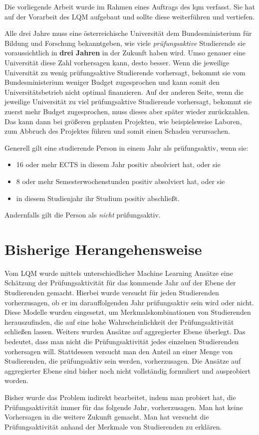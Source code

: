 

Die vorliegende Arbeit wurde im Rahmen eines Auftrags des \gls{lqm} verfasst. Sie hat auf der Vorarbeit des LQM aufgebaut und sollte diese weiterf\"uhren
und vertiefen.

Alle drei Jahre muss eine \"osterreichische Universität dem Bundesministerium f\"ur Bildung und Forschung
bekanntgeben, wie viele \textit{pr\"ufungsaktive} Studierende sie voraussichtlich in \textbf{drei Jahren}
in der Zukunft haben wird. Umso genauer eine Universität diese Zahl vorhersagen kann, desto besser.
Wenn die jeweilige Universität zu wenig pr\"ufungsaktive Studierende vorhersagt, bekommt sie vom Bundesministerium
weniger Budget zugesprochen und kann somit den Universitätsbetrieb nicht optimal finanzieren. Auf der anderen Seite,
wenn die jeweilige Universität zu viel pr\"ufungsaktive Studierende vorhersagt, bekommt sie zuerst mehr Budget zugesprochen,
muss dieses aber sp\"ater wieder zur\"uckzahlen. Das kann dann bei gr\"o{\ss}eren geplanten Projekten, wie beispielsweise Laboren,
zum Abbruch des Projektes f\"uhren und somit einen Schaden verursachen.

\noindent Generell gilt eine studierende Person in einem Jahr als pr\"ufungsaktiv, wenn sie:

\begin{itemize}
    \item 16 oder mehr ECTS in diesem Jahr positiv absolviert hat, oder sie
    \item 8 oder mehr Semesterwochenstunden positiv absolviert hat, oder sie
    \item in diesem Studienjahr ihr Studium positiv abschlie{\ss}t.
\end{itemize}
Andernfalls gilt die Person als \textit{nicht} pr\"ufungsaktiv.


\section{Bisherige Herangehensweise}

Vom LQM wurde mittels unterschiedlicher Machine Learning Ans\"atze eine Sch\"atzung der Pr\"ufungsaktivit\"at
f\"ur das kommende Jahr auf der Ebene der Studierenden gemacht. 
Hierbei wurde versucht f\"ur jeden Studierenden vorherzusagen, ob er im darauffolgenden Jahr pr\"ufungsaktiv sein wird oder nicht.
Diese Modelle wurden eingesetzt, um Merkmalskombinationen von Studierenden herauszufinden,
die auf eine hohe Wahrscheinlichkeit der Pr\"ufungsaktivit\"at schlie{\ss}en lassen.
Weiters wurden Ans\"atze auf aggregierter Ebene \"uberlegt. Das bedeutet, dass man nicht die Pr\"ufungsaktivit\"at jedes
einzelnen Studierenden vorhersagen will. Stattdessen
versucht man den Anteil an einer Menge von Studierenden, die pr\"ufungsaktiv sein werden, vorherzusagen.
Die Ans\"atze auf aggregierter Ebene sind bisher noch nicht vollst\"andig formuliert und ausprobiert worden.


Bisher wurde das Problem indirekt bearbeitet, indem man probiert hat, die Pr\"ufungsaktivit\"at
immer f\"ur das folgende Jahr, vorherzusagen. Man hat keine Vorhersagen in die weitere Zukunft gemacht.
Man hat versucht die Pr\"ufungsaktivit\"at anhand der Merkmale von Studierenden zu erkl\"aren.

